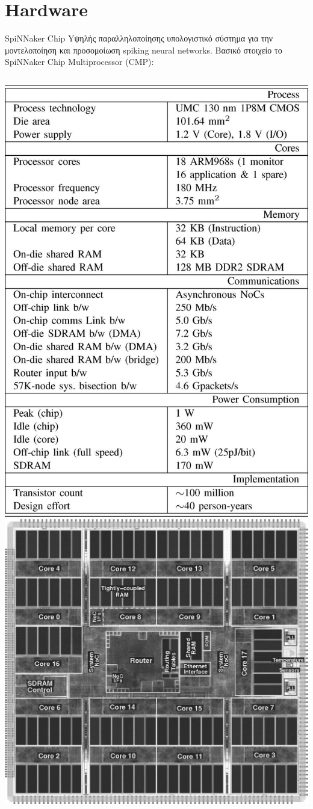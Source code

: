 \documentclass[11pt,center]{beamer}
\begin{document}
\section{Hardware}


	\begin{frame}{SpiNNaker Chip}
		Yψηλής παραλληλοποίησης υπολογιστικό σύστημα για την μοντελοποίηση και προσομοίωση spiking 				neural networks.
		\pause
		\vfill
		Βασικό στοιχείο το SpiNNaker Chip Multiprocessor (CMP):
		\vfill
		\begin{columns}
			\includegraphics[width=0.75 \textwidth,right]{../pics/CMPspecs.jpg}
			\includegraphics[width=0.75 \textwidth,left]{../pics/CMP.jpg}
		\end{columns}
	\end{frame}
\end{document}
